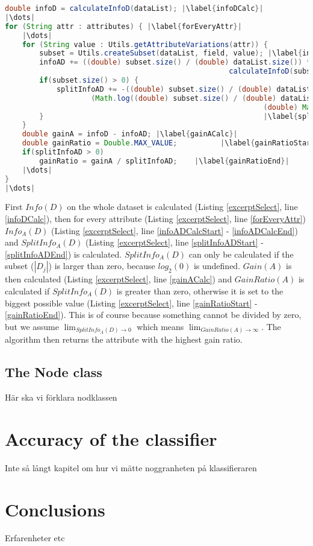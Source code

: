 \documentclass{article}
\begin{document}
    \begin{lstlisting}[language=Java, caption=Excerpt from \protect\UseVerb{term}, label={excerptSelect}, escapechar=|]
double infoD = calculateInfoD(dataList); |\label{infoDCalc}|
|\dots|
for (String attr : attributes) { |\label{forEveryAttr}|
    |\dots|
    for (String value : Utils.getAttributeVariations(attr)) {
        subset = Utils.createSubset(dataList, field, value); |\label{infoADCalcStart}|
        infoAD += ((double) subset.size() / (double) dataList.size()) *
                                                    calculateInfoD(subset); |\label{infoADCalcEnd}|
        if(subset.size() > 0) {                                             |\label{splitInfoADStart}|
            splitInfoAD += -((double) subset.size() / (double) dataList.size()) *
                    (Math.log((double) subset.size() / (double) dataList.size()) /
                                                            (double) Math.log(2));
        }                                                   |\label{splitInfoADEnd}|
    }
    double gainA = infoD - infoAD; |\label{gainACalc}|
    double gainRatio = Double.MAX_VALUE;          |\label{gainRatioStart}|
    if(splitInfoAD > 0)
        gainRatio = gainA / splitInfoAD;    |\label{gainRatioEnd}|
    |\dots|
}
|\dots|\end{lstlisting}
    First $Info(D)$ on the whole dataset is calculated (Listing \ref{excerptSelect}, line \ref{infoDCalc}), then for every attribute (Listing \ref{excerptSelect}, line \ref{forEveryAttr}) $Info_A (D)$ (Listing \ref{excerptSelect}, line \ref{infoADCalcStart} - \ref{infoADCalcEnd}) and $SplitInfo_A (D)$ (Listing \ref{excerptSelect}, line \ref{splitInfoADStart} - \ref{splitInfoADEnd}) is calculated. $SplitInfo_A (D)$ can only be calculated if the subset ($|D_j|$) is larger than zero, because $log_2 (0)$ is undefined.
    $Gain(A)$ is then calculated (Listing \ref{excerptSelect}, line \ref{gainACalc}) and $GainRatio(A)$ is calculated if $SplitInfo_A (D)$ is greater than zero, otherwise it is set to the biggest possible value  (Listing \ref{excerptSelect}, line \ref{gainRatioStart} - \ref{gainRatioEnd}). This is of course because something cannot be divided by zero, but we assume \(\lim_{SplitInfo_A (D) \to 0}\) which means  \(\lim_{GainRatio(A) \to \infty}\).
    The algorithm then returns the attribute with the highest gain ratio.

    \subsection{The Node class}
    Här ska vi förklara nodklassen

\section{Accuracy of the classifier}
Inte så långt kapitel om hur vi mätte noggranheten på klassifieraren

\section{Conclusions}
Erfarenheter etc



\end{document}
